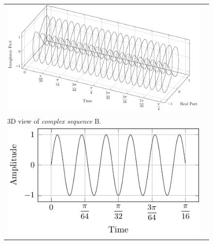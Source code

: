 \documentclass[../../course]{subfiles}
\begin{document}
\begin{figure} [H]

    \renewcommand{\arraystretch}{0.7}
    \centering
    \begin{NiceTabularX} {\textwidth} {
            *{2}{>{\centering\arraybackslash}X}
        }

         {
             {
                \includegraphics[height = \textheight] {tikzpics/plotComplexB.pdf}
            }
        }

        &
        \\

         {
            \vbox{
                 {3D view of \emph{complex sequence} B.}
                \label{plt:cmplxB}
            }
        }

        &
        \\

         {
             {
                \includegraphics[height = \textheight] {tikzpics/plotShortX1.pdf}
            }
        }

        &


\end{NiceTabularX}
\end{figure}
\end{document}
